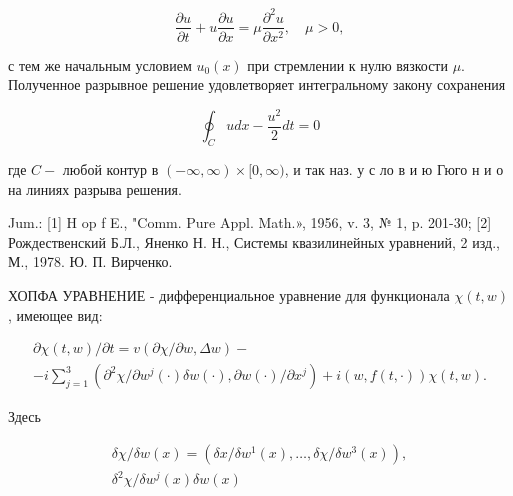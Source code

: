 \documentclass[10pt]{article}
\begin{document}
\[

\frac{\partial u}{\partial t}+u \frac{\partial u}{\partial x}=\mu \frac{\partial^{2} u}{\partial x^{2}}, \quad \mu>0,

\]



с тем же начальным условием $u_{0}(x)$ при стремлении к нулю вязкости $\mu$. Полученное разрывное решение удовлетворяет интегральному закону сохранения



\[

\oint_{C} u d x-\frac{u^{2}}{2} d t=0

\]



где $C-$ любой контур в $(-\infty, \infty) \times[0, \infty)$, и так наз. у с ло в и ю Гюго н и о на линиях разрыва решения.



Jum.: [1] H op f E., "Comm. Pure Appl. Math.», 1956, v. 3, № 1, p. 201-30; [2] Рождественский Б.Л., Яненко Н. Н., Системы квазилинейных уравнений, 2 изд., М., 1978. Ю. П. Вирченко.



ХОПФА УРАВНЕНИЕ - дифференциальное уравнение для функционала $\chi(t, w)$, имеющее вид:



\[

\begin{gathered}

\partial \chi(t, w) / \partial t=v(\partial \chi / \partial w, \Delta w)- \\

-i \sum_{j=1}^{3}\left(\partial^{2} \chi / \partial w^{j}(\cdot) \delta w(\cdot), \partial w(\cdot) / \partial x^{j}\right)+i(w, f(t, \cdot)) \chi(t, w) .

\end{gathered}

\]



Здесь



\[

\begin{gathered}

\delta \chi / \delta w(x)=\left(\delta x / \delta w^{1}(x), \ldots, \delta \chi / \delta w^{3}(x)\right), \\

\delta^{2} \chi / \delta w^{j}(x) \delta w(x)

\end{gathered}

\]
\end{document}
